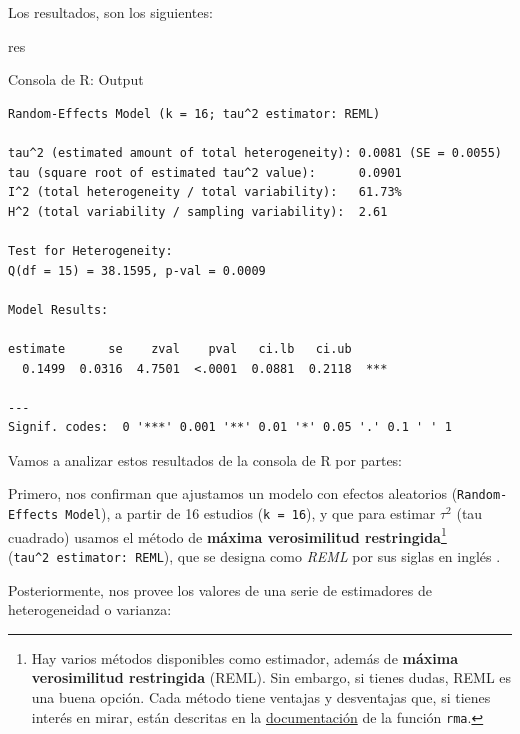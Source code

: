 \documentclass[
  bookmarksnumbered]{article}
\newenvironment{Shaded}{\begin{snugshade}}{\end{snugshade}}
\newcommand{\NormalTok}[1]{\textcolor[rgb]{0.12,0.11,0.11}{#1}}
\begin{document}
Los resultados, son los siguientes:

\begin{Shaded}
\begin{Highlighting}[]
\NormalTok{res}
\end{Highlighting}
\end{Shaded}

\begin{ROut}{Consola de R: Output~\thetcbcounter}
                \begin{footnotesize}
                \begin{verbatim} 
Random-Effects Model (k = 16; tau^2 estimator: REML)

tau^2 (estimated amount of total heterogeneity): 0.0081 (SE = 0.0055)
tau (square root of estimated tau^2 value):      0.0901
I^2 (total heterogeneity / total variability):   61.73%
H^2 (total variability / sampling variability):  2.61

Test for Heterogeneity:
Q(df = 15) = 38.1595, p-val = 0.0009

Model Results:

estimate      se    zval    pval   ci.lb   ci.ub 
  0.1499  0.0316  4.7501  <.0001  0.0881  0.2118  *** 

---
Signif. codes:  0 '***' 0.001 '**' 0.01 '*' 0.05 '.' 0.1 ' ' 1
 \end{verbatim}
                \end{footnotesize}
                \end{ROut}

Vamos a analizar estos resultados de la consola de R por partes:

Primero, nos confirman que ajustamos un modelo con efectos aleatorios (\texttt{Random-Effects\ Model}), a partir de 16 estudios (\texttt{k\ =\ 16}), y que para estimar \(\tau^2\) (tau cuadrado) usamos el método de \textbf{máxima verosimilitud restringida}\footnote{Hay varios métodos disponibles como estimador, además de \textbf{máxima verosimilitud restringida} (REML). Sin embargo, si tienes dudas, REML es una buena opción. Cada método tiene ventajas y desventajas que, si tienes interés en mirar, están descritas en la \href{https://www.rdocumentation.org/packages/metafor/versions/2.4-0/topics/rma.uni}{documentación} de la función \texttt{rma}.} (\texttt{tau\^{}2\ estimator:\ REML}), que se designa como \emph{REML} por sus siglas en inglés .

Posteriormente, nos provee los valores de una serie de estimadores de heterogeneidad o varianza:
\end{document}
